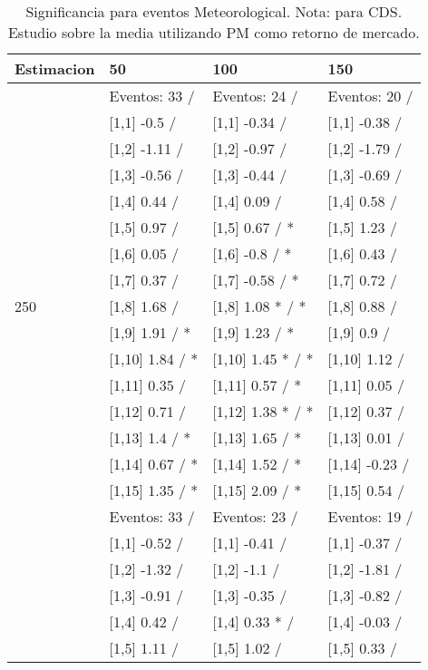 \begin{table}

\caption{Significancia para eventos Meteorological. Nota: para CDS. Estudio sobre la media utilizando PM como retorno de mercado.}
\centering
\begin{tabular}[t]{llll}
\toprule
Estimacion & 50 & 100 & 150\\
\midrule
 & Eventos:  33 / & Eventos:  24 / & Eventos:  20 /\\
 & {}[1,1] -0.5  / & {}[1,1] -0.34  / & {}[1,1] -0.38  /\\
 & {}[1,2] -1.11  / & {}[1,2] -0.97  / & {}[1,2] -1.79  /\\
 & {}[1,3] -0.56  / & {}[1,3] -0.44  / & {}[1,3] -0.69  /\\
 & {}[1,4] 0.44  / & {}[1,4] 0.09  / & {}[1,4] 0.58  /\\
\addlinespace
 & {}[1,5] 0.97  / & {}[1,5] 0.67  / * & {}[1,5] 1.23  /\\
 & {}[1,6] 0.05  / & {}[1,6] -0.8  / * & {}[1,6] 0.43  /\\
 & {}[1,7] 0.37  / & {}[1,7] -0.58  / * & {}[1,7] 0.72  /\\
250 & {}[1,8] 1.68  / & {}[1,8] 1.08 * / * & {}[1,8] 0.88  /\\
 & {}[1,9] 1.91  / * & {}[1,9] 1.23  / * & {}[1,9] 0.9  /\\
\addlinespace
 & {}[1,10] 1.84  / * & {}[1,10] 1.45 * / * & {}[1,10] 1.12  /\\
 & {}[1,11] 0.35  / & {}[1,11] 0.57  / * & {}[1,11] 0.05  /\\
 & {}[1,12] 0.71  / & {}[1,12] 1.38 * / * & {}[1,12] 0.37  /\\
 & {}[1,13] 1.4  / * & {}[1,13] 1.65  / * & {}[1,13] 0.01  /\\
 & {}[1,14] 0.67  / * & {}[1,14] 1.52  / * & {}[1,14] -0.23  /\\
\addlinespace
 & {}[1,15] 1.35  / * & {}[1,15] 2.09  / * & {}[1,15] 0.54  /\\
 & Eventos:  33 / & Eventos:  23 / & Eventos:  19 /\\
 & {}[1,1] -0.52  / & {}[1,1] -0.41  / & {}[1,1] -0.37  /\\
 & {}[1,2] -1.32  / & {}[1,2] -1.1  / & {}[1,2] -1.81  /\\
 & {}[1,3] -0.91  / & {}[1,3] -0.35  / & {}[1,3] -0.82  /\\
\addlinespace
 & {}[1,4] 0.42  / & {}[1,4] 0.33 * / & {}[1,4] -0.03  /\\
 & {}[1,5] 1.11  / & {}[1,5] 1.02  / & {}[1,5] 0.33  /\\

\end{tabular}
\end{table}
